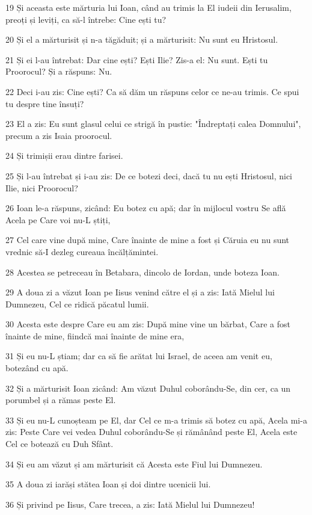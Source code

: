\par 19 Și aceasta este mărturia lui Ioan, când au trimis la El iudeii din Ierusalim, preoți și leviți, ca să-l întrebe: Cine ești tu?
\par 20 Și el a mărturisit și n-a tăgăduit; și a mărturisit: Nu sunt eu Hristosul.
\par 21 Și ei l-au întrebat: Dar cine ești? Ești Ilie? Zis-a el: Nu sunt. Ești tu Proorocul? Și a răspuns: Nu.
\par 22 Deci i-au zis: Cine ești? Ca să dăm un răspuns celor ce ne-au trimis. Ce spui tu despre tine însuți?
\par 23 El a zis: Eu sunt glasul celui ce strigă în pustie: "Îndreptați calea Domnului", precum a zis Isaia proorocul.
\par 24 Și trimișii erau dintre farisei.
\par 25 Și l-au întrebat și i-au zis: De ce botezi deci, dacă tu nu ești Hristosul, nici Ilie, nici Proorocul?
\par 26 Ioan le-a răspuns, zicând: Eu botez cu apă; dar în mijlocul vostru Se află Acela pe Care voi nu-L știți,
\par 27 Cel care vine după mine, Care înainte de mine a fost și Căruia eu nu sunt vrednic să-I dezleg cureaua încălțămintei.
\par 28 Acestea se petreceau în Betabara, dincolo de Iordan, unde boteza Ioan.
\par 29 A doua zi a văzut Ioan pe Iisus venind către el și a zis: Iată Mielul lui Dumnezeu, Cel ce ridică păcatul lumii.
\par 30 Acesta este despre Care eu am zis: După mine vine un bărbat, Care a fost înainte de mine, fiindcă mai înainte de mine era,
\par 31 Și eu nu-L știam; dar ca să fie arătat lui Israel, de aceea am venit eu, botezând cu apă.
\par 32 Și a mărturisit Ioan zicând: Am văzut Duhul coborându-Se, din cer, ca un porumbel și a rămas peste El.
\par 33 Și eu nu-L cunoșteam pe El, dar Cel ce m-a trimis să botez cu apă, Acela mi-a zis: Peste Care vei vedea Duhul coborându-Se și rămânând peste El, Acela este Cel ce botează cu Duh Sfânt.
\par 34 Și eu am văzut și am mărturisit că Acesta este Fiul lui Dumnezeu.
\par 35 A doua zi iarăși stătea Ioan și doi dintre ucenicii lui.
\par 36 Și privind pe Iisus, Care trecea, a zis: Iată Mielul lui Dumnezeu!
